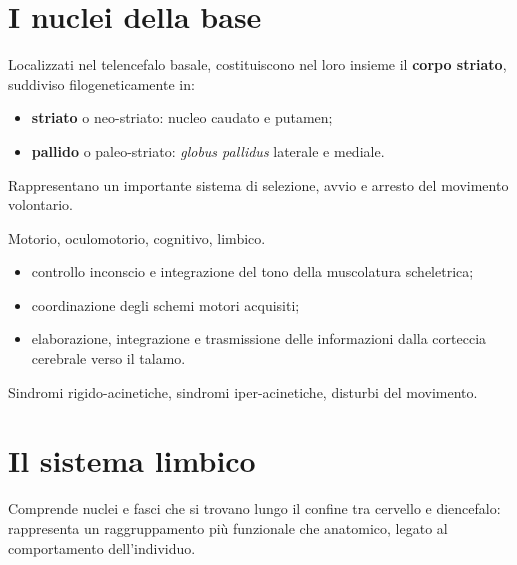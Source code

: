 \section{I nuclei della base}

Localizzati nel telencefalo basale, costituiscono nel loro insieme il
\textbf{corpo striato}, suddiviso filogeneticamente in:
\begin{itemize}
  \item \textbf{striato} o neo-striato: nucleo caudato e putamen;
  \item \textbf{pallido} o paleo-striato: \textit{globus pallidus} laterale e
    mediale.
\end{itemize}

Rappresentano un importante sistema di selezione, avvio e arresto del
movimento volontario.

Motorio, oculomotorio, cognitivo, limbico.

\begin{itemize}
  \item controllo inconscio e integrazione del tono della muscolatura
    scheletrica;
  \item coordinazione degli schemi motori acquisiti;
  \item elaborazione, integrazione e trasmissione delle informazioni dalla
    corteccia cerebrale verso il talamo.
\end{itemize}

Sindromi rigido-acinetiche, sindromi iper-acinetiche, disturbi del movimento.

\section{Il sistema limbico}

Comprende nuclei e fasci che si trovano lungo il confine tra cervello e
diencefalo: rappresenta un raggruppamento più funzionale che anatomico, legato
al comportamento dell'individuo.

